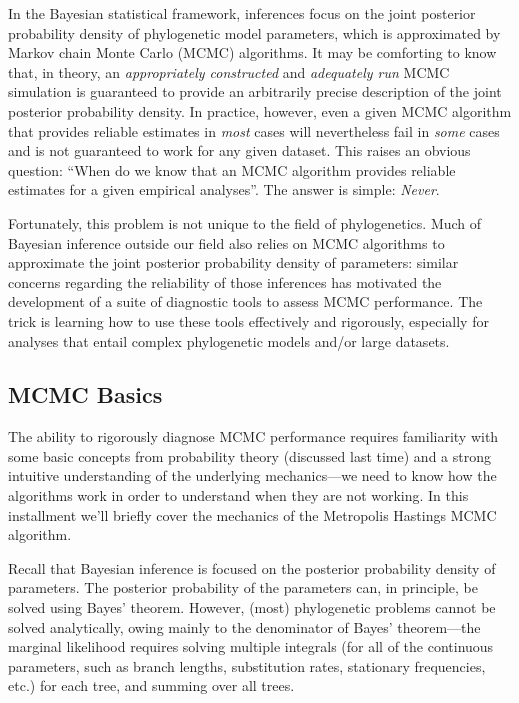 \documentclass[11pt]{article}
\begin{document}
In the Bayesian statistical framework, inferences focus on the joint posterior probability density of phylogenetic model parameters, which is approximated by Markov chain Monte Carlo (MCMC) algorithms. 
It may be comforting to know that, in theory, an {\it appropriately constructed} and {\it adequately run} MCMC simulation is guaranteed to provide an arbitrarily precise description of the joint posterior probability density. 
In practice, however, even a given MCMC algorithm that provides reliable estimates in {\it most} cases will nevertheless fail in {\it some} cases and is not guaranteed to work for any given dataset. 
This raises an obvious question: ``When do we know that an MCMC algorithm provides reliable estimates for a given empirical analyses''. The answer is simple: \emph{Never}.

Fortunately, this problem is not unique to the field of phylogenetics. 
Much of Bayesian inference outside our field also relies on MCMC algorithms to approximate the joint posterior probability density of parameters: similar concerns regarding the reliability of those inferences has motivated the development of a suite of diagnostic tools to assess MCMC performance. 
The trick is learning how to use these tools effectively and rigorously, especially for analyses that entail complex phylogenetic models and/or large datasets.

\bigskip
\subsection{MCMC Basics}

The ability to rigorously diagnose MCMC performance requires familiarity with some basic concepts from probability theory (discussed last time) and a strong intuitive understanding of the underlying mechanics---we need to know how the algorithms work in order to understand when they are not working. 
In this installment we’ll briefly cover the mechanics of the Metropolis Hastings MCMC algorithm.

Recall that Bayesian inference is focused on the posterior probability density of parameters.
The posterior probability of the parameters can, in principle, be solved using Bayes’ theorem.
However, (most) phylogenetic problems cannot be solved analytically, owing mainly to the denominator of Bayes’ theorem---the marginal likelihood requires solving multiple integrals (for all of the continuous parameters, such as branch lengths, substitution rates, stationary frequencies, etc.) for each tree, and summing over all trees.
\end{document}
